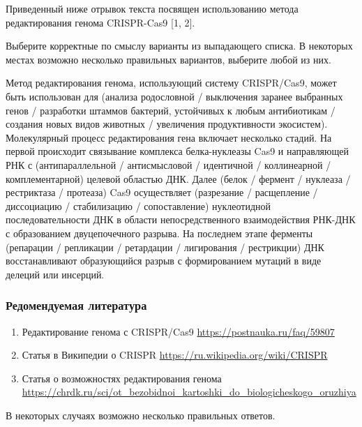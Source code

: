 
Приведенный ниже отрывок текста посвящен использованию метода редактирования генома CRISPR-Cas9 [1, 2].

Выберите корректные по смыслу варианты из выпадающего списка. В некоторых местах возможно несколько правильных вариантов, выберите любой из них.

Метод редактирования генома, использующий систему CRISPR/Cas9, может быть использован для 
(анализа родословной / выключения заранее выбранных генов / разработки штаммов бактерий, устойчивых к любым антибиотикам /
создания новых видов животных / увеличения продуктивности экосистем). 
Молекулярный процесс редактирования гена включает несколько стадий. На первой происходит связывание комплекса белка-нуклеазы Cas9 и направляющей РНК с
(антипараллельной / антисмысловой / идентичной / коллинеарной / комплементарной) целевой областью ДНК. Далее 
(белок / фермент / нуклеаза / рестриктаза / протеаза) Cas9 осуществляет 
(разрезание / расщепление / диссоциацию / стабилизацию / сопоставление) нуклеотидной последовательности ДНК в области непосредственного взаимодействия РНК-ДНК с образованием двуцепочечного разрыва. На последнем этапе ферменты 
(репарации / репликации / ретардации / лигирования / рестрикции) ДНК восстанавливают образующийся разрыв с формированием мутаций в виде делеций или инсерций.

\subsubsection*{Редомендуемая литература}

\begin{enumerate}
    \item Редактирование генома с CRISPR/Cas9 \url{https://postnauka.ru/faq/59807}
    \item Статья в Википедии о CRISPR \url{https://ru.wikipedia.org/wiki/CRISPR}
    \item Статья о возможностях редактирования генома \url{https://chrdk.ru/sci/ot_bezobidnoi_kartoshki_do_biologicheskogo_oruzhiya}
\end{enumerate}

\explanationSection

В некоторых случаях возможно несколько правильных ответов.

